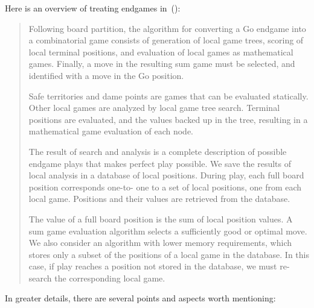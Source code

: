 Here is an overview of treating endgames in~(\cite{Muller1995computer}):
\begin{quotation}
  Following board partition, the algorithm for converting a Go endgame into a combinatorial game consists of generation of local game trees, scoring of local terminal positions, and evaluation of local games as mathematical games.
  Finally, a move in the resulting sum game must be selected, and identified with a move in the Go position.

  Safe territories and dame points are games that can be evaluated statically.
  Other local games are analyzed by local game tree search.
  Terminal positions are evaluated, and the values backed up in the tree, resulting in a mathematical game evaluation of each node.

  The result of search and analysis is a complete description of possible endgame plays that makes perfect play possible.
  We save the results of local analysis in a database of local positions.
  During play, each full board position corresponds one-to- one to a set of local positions, one from each local game.
  Positions and their values are retrieved from the database.

  The value of a full board position is the sum of local position values.
  A sum game evaluation algorithm selects a sufficiently good or optimal move.
  We also consider an algorithm with lower memory requirements, which stores only a subset of the positions of a local game in the database.
  In this case, if play reaches a position not stored in the database, we must re-search the corresponding local game.
\end{quotation}
In greater details, there are several points and aspects worth mentioning:
